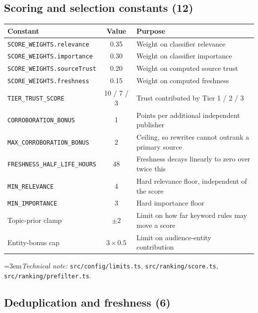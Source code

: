 \documentclass[11pt,a4paper]{article}
\newcommand{\file}[1]{\textcolor{aitkGray}{\texttt{\footnotesize\hyphenpenalty=0\exhyphenpenalty=0\relax #1}}}
\newcommand{\brk}{\hyphenpenalty=0\exhyphenpenalty=0\relax}
\newcommand{\code}[1]{\texttt{\small\brk #1}}
\newcommand{\technote}[1]{\par\vspace{-0.25em}\begingroup\footnotesize\color{aitkGray}\sloppy\emergencystretch=3em\textit{Technical note:} #1\par\endgroup}
\begin{document}
\subsection{Scoring and selection constants (12)}

\begin{center}
\footnotesize
\begin{tabularx}{\textwidth}{@{}>{\RaggedRight}p{5.0cm} c >{\RaggedRight}X@{}}
\toprule
\textbf{Constant} & \textbf{Value} & \textbf{Purpose} \\
\midrule
\code{SCORE\_WEIGHTS.relevance} & 0.35 & Weight on classifier relevance \\
\code{SCORE\_WEIGHTS.importance} & 0.30 & Weight on classifier importance \\
\code{SCORE\_WEIGHTS.sourceTrust} & 0.20 & Weight on computed source trust \\
\code{SCORE\_WEIGHTS.freshness} & 0.15 & Weight on computed freshness \\
\code{TIER\_TRUST\_SCORE} & 10 / 7 / 3 & Trust contributed by Tier 1 / 2 / 3 \\
\code{CORROBORATION\_BONUS} & 1 & Points per additional independent publisher \\
\code{MAX\_CORROBORATION\_BONUS} & 2 & Ceiling, so rewrites cannot outrank a primary source \\
\code{FRESHNESS\_HALF\_LIFE\_HOURS} & 48 & Freshness decays linearly to zero over twice this \\
\code{MIN\_RELEVANCE} & 4 & Hard relevance floor, independent of the score \\
\code{MIN\_IMPORTANCE} & 3 & Hard importance floor \\
Topic-prior clamp & $\pm 2$ & Limit on how far keyword rules may move a score \\
Entity-bonus cap & $3 \times 0.5$ & Limit on audience-entity contribution \\
\bottomrule
\end{tabularx}
\end{center}
\technote{\file{src/config/limits.ts}, \file{src/ranking/score.ts}, \file{src/ranking/prefilter.ts}.}

\subsection{Deduplication and freshness (6)}
\end{document}
